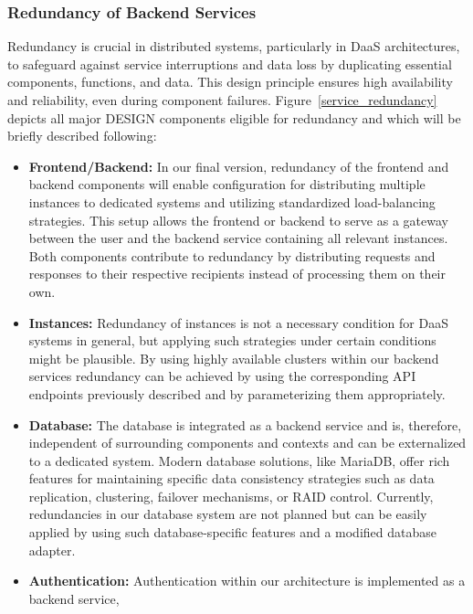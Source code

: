 \documentclass[runningheads]{llncs}
\begin{document}
\subsubsection{Redundancy of Backend Services}

Redundancy is crucial in distributed systems,
particularly in DaaS architectures,
to safeguard against service interruptions and data loss
by duplicating essential components, functions, and data.
This design principle ensures high availability and reliability,
even during component failures.
Figure~\ref{service_redundancy} depicts all major DESIGN components eligible for redundancy
and which will be briefly described following:
\begin{itemize}
	\item \textbf{Frontend/Backend:}
	      In our final version,
	      redundancy of the frontend and backend components
	      will enable configuration for distributing multiple instances
	      to dedicated systems and utilizing standardized load-balancing strategies.
	      This setup allows the frontend or backend
	      to serve as a gateway between the user and the backend service
	      containing all relevant instances.
	      Both components contribute to redundancy
	      by distributing requests and responses to their respective recipients
	      instead of processing them on their own.
	\item \textbf{Instances:} Redundancy of instances
	      is not a necessary condition for DaaS systems in general,
	      but applying such strategies under certain conditions might be plausible.
	      By using highly available clusters within our backend services
	      redundancy can be achieved by using the corresponding API endpoints
	      previously described and by parameterizing them appropriately.
	\item \textbf{Database:}
	      The database is integrated as a backend service
	      and is, therefore, independent of surrounding components and contexts
	      and can be externalized to a dedicated system.
	      Modern database solutions, like MariaDB,
	      offer rich features for maintaining specific data consistency strategies
	      such as data replication, clustering, failover mechanisms, or RAID control.
	      Currently, redundancies in our database system are not planned
	      but can be easily applied by using such database-specific features
	      and a modified database adapter.
	\item \textbf{Authentication: }
	      Authentication within our architecture is implemented as a backend service,

\end{itemize}
\end{document}
